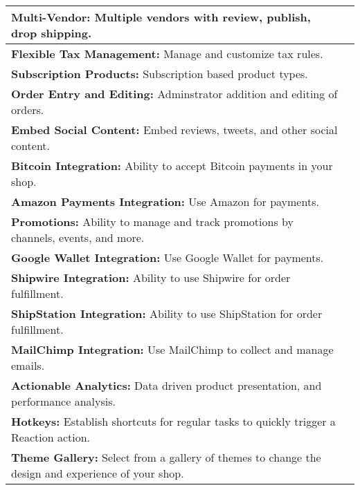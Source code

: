 \begin{table}[h!]
\begin{tabular}{ |L{0.6\paperwidth}|L{0.1\paperwidth}|}
\\ \hline
	\textbf{ Multi-Vendor:} Multiple vendors with review, publish, drop shipping.&
	
\\ \hline
	\textbf{ Flexible Tax Management:} Manage and customize tax rules.&
	
\\ \hline
	\textbf{ Subscription Products:} Subscription based product types.&
	
\\ \hline
	\textbf{ Order Entry and Editing:} Adminstrator addition and editing of orders.&
	
\\ \hline
	\textbf{ Embed Social Content:} Embed reviews, tweets, and other social content.&
	
\\ \hline
	\textbf{ Bitcoin Integration:} Ability to accept Bitcoin payments in your shop.&
	
\\ \hline
	\textbf{ Amazon Payments Integration:} Use Amazon for payments.&
	
\\ \hline
	\textbf{ Promotions:} Ability to manage and track promotions by channels, events, and more.&
	
\\ \hline
	\textbf{ Google Wallet Integration:} Use Google Wallet for payments.&
	
\\ \hline
	\textbf{ Shipwire Integration:} Ability to use Shipwire for order fulfillment.&
	
\\ \hline
	\textbf{ ShipStation Integration:} Ability to use ShipStation for order fulfillment.&
	
\\ \hline
	\textbf{ MailChimp Integration:} Use MailChimp to collect and manage emails.&
	
\\ \hline
	\textbf{ Actionable Analytics:} Data driven product presentation, and performance analysis.&
	
\\ \hline
	\textbf{ Hotkeys:} Establish shortcuts for regular tasks to quickly trigger a Reaction action.&
	
\\ \hline
	\textbf{ Theme Gallery:} Select from a gallery of themes to change the design and experience of your shop.&
	

\end{tabular}
\end{table}
